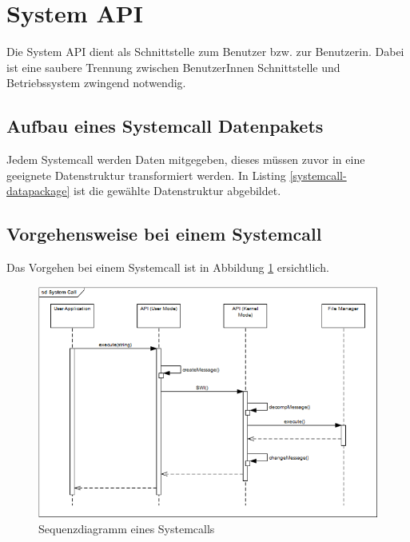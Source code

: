 \section{System API}
\label{chapAPI}
Die System API dient als Schnittstelle zum Benutzer bzw. zur Benutzerin. Dabei ist eine saubere Trennung zwischen BenutzerInnen Schnittstelle und Betriebssystem zwingend notwendig.

\subsection{Aufbau eines Systemcall Datenpakets}
Jedem Systemcall werden Daten mitgegeben, dieses müssen zuvor in eine geeignete Datenstruktur transformiert werden. In Listing \ref{systemcall-datapackage} ist die gewählte Datenstruktur abgebildet.




\subsection{Vorgehensweise bei einem Systemcall}
Das Vorgehen bei einem Systemcall ist in Abbildung \ref{fig:Sequencediagram-systemcall} ersichtlich. 

\begin{figure}[H]
	\includegraphics[scale=0.70]{chapters/systemapi/figures/systemcall-sequence-diagram}
	\caption{Sequenzdiagramm eines Systemcalls}
	\label{fig:Sequencediagram-systemcall}
\end{figure}

\pagebreak 